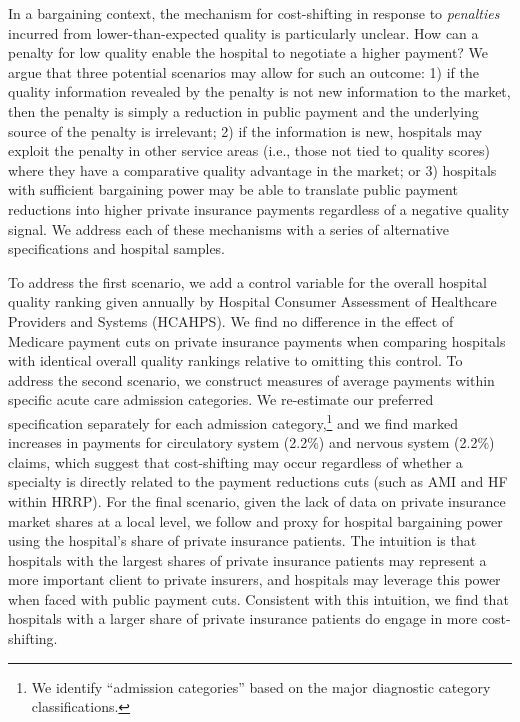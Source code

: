 \documentclass[12pt]{article}
\begin{document}
In a bargaining context, the mechanism for cost-shifting in response to \textit{penalties} incurred from lower-than-expected quality is particularly unclear. How can a penalty for low quality enable the hospital to negotiate a higher payment? We argue that three potential scenarios may allow for such an outcome: 1) if the quality information revealed by the penalty is not new information to the market, then the penalty is simply a reduction in public payment and the underlying source of the penalty is irrelevant; 2) if the information is new, hospitals may exploit the penalty in other service areas (i.e., those not tied to quality scores) where they have a comparative quality advantage in the market; or 3) hospitals with sufficient bargaining power may be able to translate public payment reductions into higher private insurance payments regardless of a negative quality signal. We address each of these mechanisms with a series of alternative specifications and hospital samples.

To address the first scenario, we add a control variable for the overall hospital quality ranking given annually by Hospital Consumer Assessment of Healthcare Providers and Systems (HCAHPS).  We find no difference in the effect of Medicare payment cuts on private insurance payments when comparing hospitals with identical overall quality rankings relative to omitting this control.  To address the second scenario, we construct measures of average payments within specific acute care admission categories. We re-estimate our preferred specification separately for each admission category,\footnote{We identify ``admission categories'' based on the major diagnostic category classifications.} and we find marked increases in payments for circulatory system (2.2$\%$) and nervous system (2.2$\%$) claims, which suggest that cost-shifting may occur regardless of whether a specialty is directly related to the payment reductions cuts (such as AMI and HF within HRRP).  For the final scenario, given the lack of data on private insurance market shares at a local level, we follow \cite{wu2010} and proxy for hospital bargaining power using the hospital's share of private insurance patients. The intuition is that hospitals with the largest shares of private insurance patients may represent a more important client to private insurers, and hospitals may leverage this power when faced with public payment cuts. Consistent with this intuition, we find that hospitals with a larger share of private insurance patients do engage in more cost-shifting.
\end{document}
